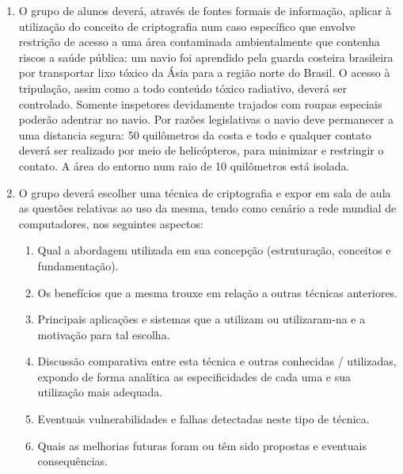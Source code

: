 \documentclass[12pt]{article}
\begin{document}
\begin{enumerate}


\item O grupo de alunos deverá, através de fontes formais de informação, aplicar à
utilização do conceito de criptografia num caso específico que envolve
restrição de acesso a uma área contaminada ambientalmente que contenha
riscos a saúde pública: um navio foi aprendido pela guarda costeira brasileira
por transportar lixo tóxico da Ásia para a região norte do Brasil. O acesso à
tripulação, assim como a todo conteúdo tóxico radiativo, deverá ser
controlado. Somente inspetores devidamente trajados com roupas especiais
poderão adentrar no navio. Por razões legislativas o navio deve permanecer a
uma distancia segura: 50 quilômetros da costa e todo e qualquer contato
deverá ser realizado por meio de helicópteros, para minimizar e restringir o
contato. A área do entorno num raio de 10 quilômetros está isolada.

\item  O grupo deverá escolher uma técnica de criptografia e expor em sala de aula
as questões relativas ao uso da mesma, tendo como cenário a rede mundial
de computadores, nos seguintes aspectos:
\begin{enumerate}
\item Qual a abordagem utilizada em sua concepção (estruturação,
conceitos e fundamentação).
\item Os benefícios que a mesma trouxe em relação a outras técnicas
anteriores.
\item Principais aplicações e sistemas que a utilizam ou utilizaram-na e a
motivação para tal escolha.

\item Discussão comparativa entre esta técnica e outras conhecidas /
utilizadas, expondo de forma analítica as especificidades de cada uma
e sua utilização mais adequada.
\item Eventuais vulnerabilidades e falhas detectadas neste tipo de técnica.
\item Quais as melhorias futuras foram ou têm sido propostas e eventuais
consequências.
\end{enumerate}



\end{enumerate}
\end{document}
